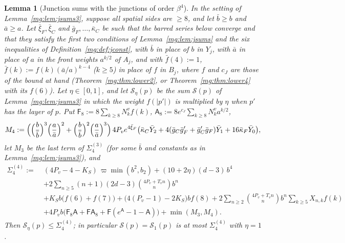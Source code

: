 \documentclass[11pt,a4paper]{article}
\newtheorem{lemma}[theorem]{Lemma}
\theoremstyle{definition}
\theoremstyle{remark}
\begin{document}
\begin{lemma}[Junction sums with the junctions of order $\beta^4$]\label{mg:lem:jsums4}
In the setting of Lemma~\ref{mg:lem:jsums3}, suppose all spatial sides are $\ge8$, and let $\bar b\ge b$ and $\bar a\ge a$. Let $\bar\xi_F,\bar\xi_C$ and
$\bar g_F,\dots,\bar\kappa_C$ be such that the barred series below converge and that they satisfy the first two conditions of Lemma~\ref{mg:lem:jsums} and the six inequalities of Definition~\ref{mg:def:jconst}, with $\bar b$ in place of
$b$ in $Y_j$, with $\bar a$ in place of $a$ in the front weights $a^{k/2}$ of $A_j$, and with $\bar f(4):=1$, $\bar f(k):=f(k)(\bar a/a)^{k-4}$ ($k\ge5$) in place of
$f$ in $B_j$, where $f$ and $c_J$ are those of the bound at hand (Theorem~\ref{mg:thm:lower2}, or Theorem~\ref{mg:thm:lower4} with its $f(6)$). Let $\eta\in[0,1]$, and
let $\mathcal S_\eta(p)$ be the sum $\mathcal S(p)$ of Lemma~\ref{mg:lem:jsums3} in which the weight $f(|p'|)$ is multiplied by $\eta$ when $p'$ has the layer of $p$.
Put $\mathsf F_8:=8\sum_{k\ge8}N^v_kf(k)$, $\mathsf A_8:=8e^{c_J}\sum_{k\ge8}N^v_ka^{k/2}$,
\[
M_4:=\Bigl(\Bigl(\frac b{\bar b}\Bigr)^3\Bigl(\frac a{\bar a}\Bigr)^2+\Bigl(\frac b{\bar b}\Bigr)^2\Bigl(\frac a{\bar a}\Bigr)^3\Bigr)\,4P_ve^{4\bar\xi_F}\bigl(\bar\kappa_C\bar Y_2+4(\bar g_C\bar g'_F+\bar g'_C\bar g_F)\bar Y_1+16\bar\kappa_F\bar Y_0\bigr),
\]
let $M_3$ be the last term of $\Sigma^{(3)}_4$ (for some $\bar b$ and constants as in Lemma~\ref{mg:lem:jsums3}), and
\begin{align*}
\Sigma^{(4)}_4:=\;&(4P_v-4-K_S)\,\varpi\min(b^2,b_2)+(10+2\eta)(d-3)\,b^4\\
&+2\sum_{n\ge5}(n+1)(2d-3)\binom{4P_v+T_vn}{n}b^n\\
&+K_Sb\bigl(f(6)+f(7)\bigr)+\bigl(4(P_v-1)-2K_S\bigr)bf(8)+2\sum_{n\ge2}\binom{4P_v+T_vn}{n}b^n\sum_{k\ge5}X_{n,k}f(k)\\
&+4P_vb\bigl(\mathsf F_8\mathsf A+\mathsf F\mathsf A_8+\mathsf F(e^{\mathsf A}-1-\mathsf A)\bigr)+\min(M_3,M_4).
\end{align*}
Then $\mathcal S_\eta(p)\le\Sigma^{(4)}_4$; in particular $\mathcal S(p)=\mathcal S_1(p)$ is at most $\Sigma^{(4)}_4$ with $\eta=1$.
\end{lemma}
\end{document}
